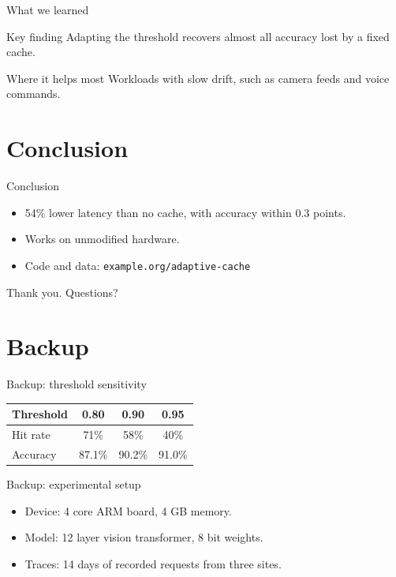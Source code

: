 \documentclass[aspectratio=169]{beamer}
\begin{document}
\begin{frame}{What we learned}
  \begin{block}{Key finding}
    Adapting the threshold recovers almost all accuracy lost by a fixed cache.
  \end{block}
  \begin{exampleblock}{Where it helps most}
    Workloads with slow drift, such as camera feeds and voice commands.
  \end{exampleblock}
\end{frame}

\section{Conclusion}
\begin{frame}{Conclusion}
  \begin{itemize}
    \item 54\% lower latency than no cache, with accuracy within 0.3 points.
    \item Works on unmodified hardware.
    \item Code and data: \texttt{example.org/adaptive-cache}
  \end{itemize}
  \vspace{2em}
  \centering
  {\Large Thank you. Questions?}
\end{frame}

\appendix
\section*{Backup}
\begin{frame}{Backup: threshold sensitivity}
  \begin{tabular}{lccc}
    \toprule
    Threshold & 0.80 & 0.90 & 0.95 \\
    \midrule
    Hit rate & 71\% & 58\% & 40\% \\
    Accuracy & 87.1\% & 90.2\% & 91.0\% \\
    \bottomrule
  \end{tabular}
\end{frame}

\begin{frame}{Backup: experimental setup}
  \begin{itemize}
    \item Device: 4 core ARM board, 4 GB memory.
    \item Model: 12 layer vision transformer, 8 bit weights.
    \item Traces: 14 days of recorded requests from three sites.
  \end{itemize}
\end{frame}
\end{document}
